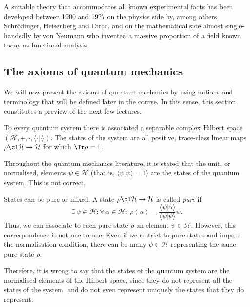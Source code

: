     A suitable theory that accommodates all known experimental facts has been developed between 1900 and 1927 on the physics side by, among others, Schr\"odinger, Heisenberg and Dirac, and on the mathematical side almost single-handedly by von Neumann who invented a massive proportion of a field known today as functional analysis.

\subsection{The axioms of quantum mechanics}
    We will now present the axioms of quantum mechanics by using notions and terminology that will be defined later in the course. In this sense, this section constitutes a preview of the next few lectures. 

    \begin{tcolorbox}[colframe=blue!10!black,before skip=10pt,after skip=10pt]
        \begin{axiom}
            To every quantum system there is associated a separable complex Hilbert space $(\mathcal{H},+,\cdot,\langle \cdot | \cdot \rangle)$. The states of the system are all positive, trace-class linear maps $\rho\cl \mathcal{H}\to \mathcal{H}$ for which $\Tr\rho=1$.
        \end{axiom}
    \end{tcolorbox}

    \begin{remark}
        Throughout the quantum mechanics literature, it is stated that the unit, or normalised, elements $\psi\in\mathcal{H}$ (that is, $\langle\psi|\psi\rangle=1$) are the states of the quantum system. This is not correct. 

        States can be pure or mixed. A state $\rho\cl \mathcal{H}\to \mathcal{H}$ is called \emph{pure} if
        \begin{equation*}
            \exists \, \psi\in \mathcal{H} : \forall \, \alpha\in \mathcal{H} : \ \rho(\alpha) = \frac{\langle\psi|\alpha\rangle}{\langle\psi|\psi\rangle}\psi.
        \end{equation*}
        Thus, we can associate to each pure state $\rho$ an element $\psi\in\mathcal{H}$. However, this correspondence is not one-to-one. Even if we restrict to pure states and impose the normalisation condition, there can be many $\psi\in\mathcal{H}$ representing the same pure state $\rho$. 

        Therefore, it is wrong to say that the states of the quantum system are the normalised elements of the Hilbert space, since they do not represent all the states of the system, and do not even represent uniquely the states that they do represent.
    \end{remark}

